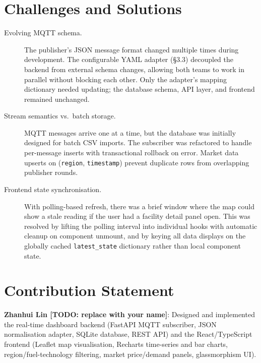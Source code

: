 \documentclass[11pt,a4paper]{article}
\begin{document}
\section{Challenges and Solutions}

\begin{description}
    \item[Evolving MQTT schema.] The publisher's JSON message format changed multiple times during development. The configurable YAML adapter (\S3.3) decoupled the backend from external schema changes, allowing both teams to work in parallel without blocking each other. Only the adapter's mapping dictionary needed updating; the database schema, API layer, and frontend remained unchanged.
    \item[Stream semantics vs.\ batch storage.] MQTT messages arrive one at a time, but the database was initially designed for batch CSV imports. The subscriber was refactored to handle per-message inserts with transactional rollback on error. Market data upserts on (\texttt{region}, \texttt{timestamp}) prevent duplicate rows from overlapping publisher rounds.
    \item[Frontend state synchronisation.] With polling-based refresh, there was a brief window where the map could show a stale reading if the user had a facility detail panel open. This was resolved by lifting the polling interval into individual hooks with automatic cleanup on component unmount, and by keying all data displays on the globally cached \texttt{latest\_state} dictionary rather than local component state.
\end{description}

\section{Contribution Statement}


\textbf{Zhanhui Lin [TODO: replace with your name]}: Designed and implemented the real-time dashboard backend (FastAPI MQTT subscriber, JSON normalisation adapter, SQLite database, REST API) and the React/TypeScript frontend (Leaflet map visualisation, Recharts time-series and bar charts, region/fuel-technology filtering, market price/demand panels, glassmorphism UI).
\end{document}
